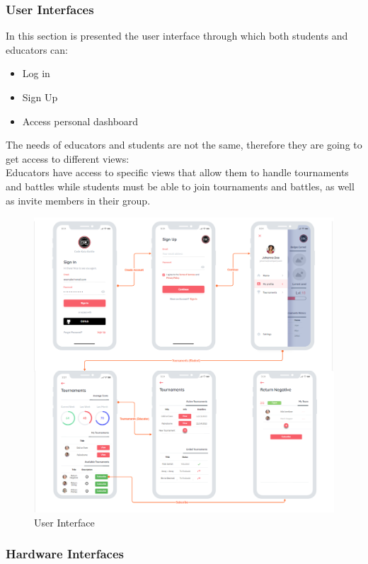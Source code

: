 \documentclass{article}
\begin{document}
\subsubsection{User Interfaces}
In this section is presented the user interface through which both students and educators can:
\begin{itemize}
    \item Log in
    \item Sign Up
    \item Access personal dashboard
\end{itemize}
The needs of educators and students are not the same, therefore they are going to get access to different views:\\
Educators have access to specific views that allow them to handle tournaments and battles while students must be able to join tournaments and battles, as well as invite members in their group.



\begin{figure}
    \hspace*{-2cm}
    \includegraphics[scale=1.5]{UI.png}
    \caption{User Interface}
\end{figure}
\newpage
\subsubsection{Hardware Interfaces}
\end{document}
